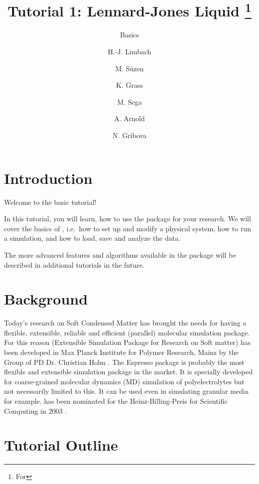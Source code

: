 \documentclass[
paper=a4,                       %
fontsize=11pt,                  %
twoside,                        %
footsepline,                    %
headsepline,                    %
headinclude=false,              %
footinclude=false,              %
pagesize,                       %
]{scrartcl}
\begin{document}
\esptitlehead

\title{Tutorial 1: Lennard-Jones Liquid%
\ifdefined\esversion%
\thanks{For \es \esversion}%
\fi%
}
\subtitle{\es Basics}
\author{H.-J. Limbach \and M. S\"uzen \and K. Grass \and M. Sega \and
  A. Arnold \and N. Gribova}
\maketitle
\tableofcontents

\section{Introduction}

Welcome to the basic \es{} tutorial!

In this tutorial, you will learn, how to use the \es{} package for your 
research. We will cover the basics of \es, i.e.~how to set up and modify a 
physical system, how to run a simulation, and how to load, save and analyze the 
data.

The more advanced features and algorithms available in the \es{} package will 
be described in additional tutorials in the future.

\section{Background}
Today's research on Soft Condensed Matter has brought the needs for having a 
flexible, extensible, reliable and efficient (parallel) molecular simulation 
package. For this reason \es{} (Extensible Simulation Package for Research on 
Soft matter) \cite{esp_url} has been developed in Max Planck Institute for 
Polymer Research, Mainz by the Group of PD Dr. Christian Holm 
\cite{limbach2006ees}. The Espresso package is probably the most flexible and 
extensible simulation package in the market. It is specially developed for 
coarse-grained molecular dynamics (MD) simulation of polyelectrolytes but not 
necessarily limited to this. It can be used even in simulating granular media 
for example. \es{} has been nominated for the Heinz-Billing-Preis for 
Scientific Computing in 2003 \cite{arnold2003ees}.

\section{Tutorial Outline}

% 
% 
% 
% 
\end{document}
